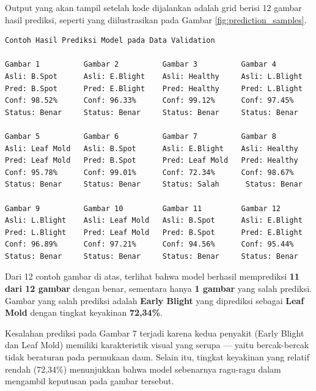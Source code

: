 
Output yang akan tampil setelah kode dijalankan adalah grid berisi 12 gambar hasil prediksi, seperti yang diilustrasikan pada Gambar \ref{fig:prediction_samples}.

\begin{outputcode}[H]
\begin{lstlisting}[language={}]
Contoh Hasil Prediksi Model pada Data Validation

Gambar 1          Gambar 2          Gambar 3          Gambar 4
Asli: B.Spot      Asli: E.Blight    Asli: Healthy     Asli: L.Blight
Pred: B.Spot      Pred: E.Blight    Pred: Healthy     Pred: L.Blight
Conf: 98.52%      Conf: 96.33%      Conf: 99.12%      Conf: 97.45%
Status: Benar     Status: Benar     Status: Benar     Status: Benar

Gambar 5          Gambar 6          Gambar 7          Gambar 8
Asli: Leaf Mold   Asli: B.Spot      Asli: E.Blight    Asli: Healthy
Pred: Leaf Mold   Pred: B.Spot      Pred: Leaf Mold   Pred: Healthy
Conf: 95.78%      Conf: 99.01%      Conf: 72.34%      Conf: 98.67%
Status: Benar     Status: Benar     Status: Salah      Status: Benar

Gambar 9          Gambar 10         Gambar 11         Gambar 12
Asli: L.Blight    Asli: Leaf Mold   Asli: B.Spot      Asli: E.Blight
Pred: L.Blight    Pred: Leaf Mold   Pred: B.Spot      Pred: E.Blight
Conf: 96.89%      Conf: 97.21%      Conf: 94.56%      Conf: 95.44%
Status: Benar     Status: Benar     Status: Benar     Status: Benar
\end{lstlisting}
\caption{Ilustrasi contoh hasil prediksi model pada data validation}
\label{fig:prediction_samples}
\end{outputcode}

Dari 12 contoh gambar di atas, terlihat bahwa model berhasil memprediksi \textbf{11 dari 12 gambar} dengan benar, sementara hanya \textbf{1 gambar} yang salah prediksi. Gambar yang salah prediksi adalah \textbf{Early Blight} yang diprediksi sebagai \textbf{Leaf Mold} dengan tingkat keyakinan \textbf{72,34\%}.

Kesalahan prediksi pada Gambar 7 terjadi karena kedua penyakit (Early Blight dan Leaf Mold) memiliki karakteristik visual yang serupa --- yaitu bercak-bercak tidak beraturan pada permukaan daun. Selain itu, tingkat keyakinan yang relatif rendah (72,34\%) menunjukkan bahwa model sebenarnya ragu-ragu dalam mengambil keputusan pada gambar tersebut.


